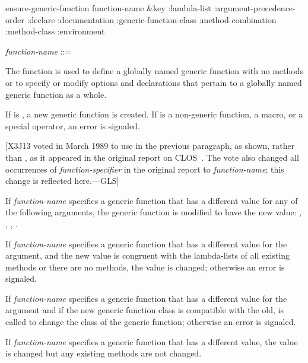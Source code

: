 \begin{defun}[Function]
ensure-generic-function function-name &key :lambda-list
:argument-precedence-order
:declare
:documentation
:generic-function-class
:method-combination
:method-class
:environment

\begin{tabbing}
\emph{function-name\/} ::= 
\end{tabbing}
The function  is used to define a
globally named generic function with no methods or to specify or
modify options and declarations that pertain to a globally named
generic function as a whole.

If  is , a new
generic function is created.  If  is a non-generic function, a macro, or a
special operator, an error is signaled.

[X3J13 voted in March 1989  to use 
in the previous paragraph, as shown, rather than ,
as it appeared in the original report on CLOS~\cite{SIGPLAN-CLOS,LASC-CLOS-PART-2}.
The vote also changed all occurrences of \emph{function-specifier} in the
original report to \emph{function-name}; this change is reflected here.---GLS]

If \emph{function-name\/} specifies a generic function that has a
different value for any of the following arguments, the generic
function is modified to have the new value: 
, , ,
.

If \emph{function-name\/} specifies a generic function that has a
different value for the  argument, and the new value
is congruent with the lambda-lists of all existing methods or there
are no methods, the value is changed; otherwise an error is signaled.

If \emph{function-name\/} specifies a generic function that has a
different value for the  argument and if
the new generic function class is compatible with the old, 
 is called to change the class of the generic function;
otherwise an error is signaled.

If \emph{function-name\/} specifies a generic function that has a
different  value, the value is
changed but any existing methods are not changed.





\end{defun}
